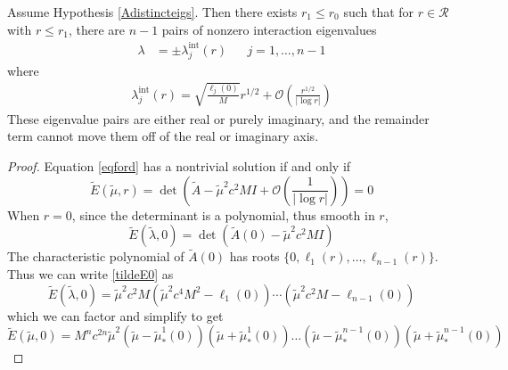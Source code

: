 \documentclass[thesis.tex]{subfiles}
\begin{document}
\begin{lemma}\label{inteigslemma}
Assume Hypothesis \ref{Adistincteigs}. Then there exists $r_1 \leq r_0$ such that for $r \in \mathcal{R}$ with $r \leq r_1$, there are $n - 1$ pairs of nonzero interaction eigenvalues
\begin{align*}
\lambda &= \pm \lambda^{\text{int}}_j(r) && j = 1, \dots, n-1
\end{align*}
where
\begin{align*}
\lambda^{\text{int}}_j(r) = \sqrt{\frac{\ell_j(0)}{M}}r^{1/2} + \mathcal{O}\left( \frac{r^{1/2}}{|\log r|}\right)
\end{align*}
These eigenvalue pairs are either real or purely imaginary, and the remainder term cannot move them off of the real or imaginary axis.

\begin{proof}
Equation \eqref{eqford} has a nontrivial solution if and only if
\[
\tilde{E}(\tilde{\mu}, r) = \det
\left( \tilde{A} - \tilde{\mu}^2 c^2 M I + \mathcal{O}\left(\frac{1}{|\log r| }\right) \right) = 0
\]
When $r = 0$, since the determinant is a polynomial, thus smooth in $r$, 
\begin{equation}\label{tildeE0}
\tilde{E}(\tilde{\lambda}, 0) = \det(\tilde{A}(0) - \tilde{\mu}^2 c^2 MI)
\end{equation}
The characteristic polynomial of $\tilde{A}(0)$ has roots $\{0,\ell_1(r), \dots, \ell_{n-1}(r) \}$. Thus we can write \cref{tildeE0} as
\begin{equation}\label{tildeE1}
\tilde{E}(\tilde{\lambda}, 0) = \tilde{\mu}^2 c^2 M \left( \tilde{\mu}^2 c^4 M^2 - \ell_1(0) \right )\cdots\left( \tilde{\mu}^2 c^2 M - \ell_{n-1}(0) \right )
\end{equation}
which we can factor and simplify to get
\begin{equation}\label{tildeE2}
\tilde{E}(\tilde{\mu}, 0) = M^n c^{2n} \tilde{\mu}^2
\left( \tilde{\mu} - \tilde{\mu}_*^1(0) \right)
\left( \tilde{\mu} + \tilde{\mu}_*^1(0) \right) \dots
\left( \tilde{\mu} - \tilde{\mu}_*^{n-1}(0) \right)
\left( \tilde{\mu} + \tilde{\mu}_*^{n-1}(0) \right)
\end{equation}


\end{proof}
\end{lemma}
\end{document}

